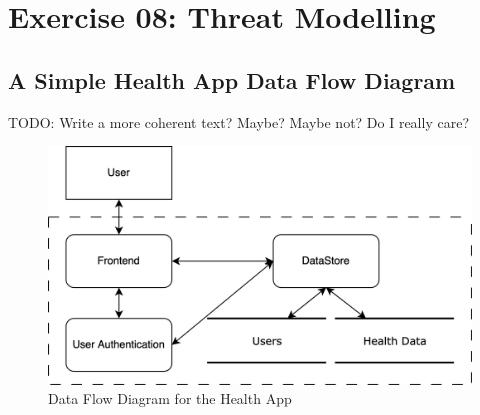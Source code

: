 \section{Exercise 08: Threat Modelling}
\subsection{A Simple Health App Data Flow Diagram}
TODO: Write a more coherent text? Maybe? Maybe not? Do I really care?
\begin{figure}[H]
  \caption{Data Flow Diagram for the Health App}
  \vspace*{1em}
  \begin{center}
    \includegraphics[width=\textwidth]{Diagrams/threat-modelling-1.png}
  \end{center}
\end{figure}
